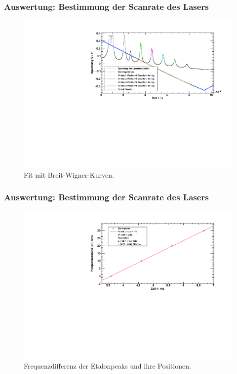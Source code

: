 \begin{frame}
\frametitle{Auswertung: Bestimmung der Scanrate des Lasers}
\begin{figure}
    \centering
    \includegraphics[width=\textwidth]{../img/down-etalon_zoom_fit.pdf}
    \caption{Fit mit Breit-Wigner-Kurven.}
\end{figure}
\end{frame}

\begin{frame}
\frametitle{Auswertung: Bestimmung der Scanrate des Lasers}
  \begin{figure}[H]
      \centering
      \includegraphics[width=\textwidth]{../img/down-etalon_zoom-etalon_calibration.pdf}
      \caption{Frequenzdifferenz der Etalonpeaks und ihre Positionen.}
  \end{figure}
\end{frame}


